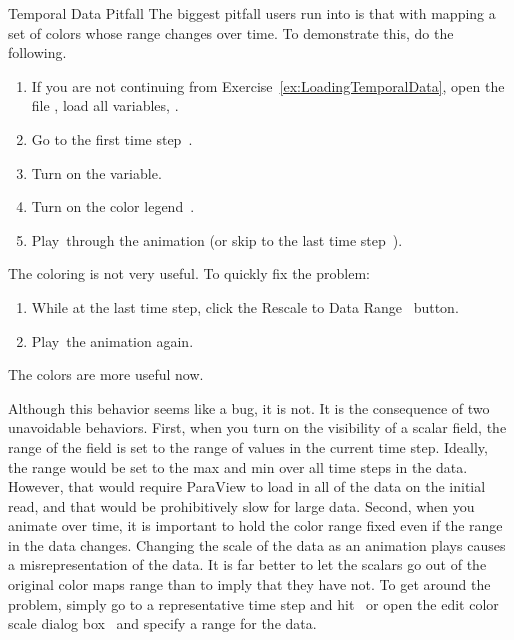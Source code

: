 \begin{exercise}{Temporal Data Pitfall}
  \label{ex:TemporalDataPitfall}%
  The biggest pitfall users run into is that with mapping a set of colors
  whose range changes over time.  To demonstrate this, do the following.

  \begin{enumerate}
  \item If you are not continuing from
    Exercise~\ref{ex:LoadingTemporalData}, open the file ,
    load all variables, \apply.
  \item Go to the first time step~\vcrFirst.
  \item Turn on the  variable.
  \item Turn on the color legend~.
  \item Play~\vcrPlay through the animation (or skip to the last time
    step~\vcrLast).
    \savecounter
  \end{enumerate}

  The coloring is not very useful.  To quickly fix the problem:

  \begin{enumerate}
    \restorecounter
  \item While at the last time step, click the Rescale to Data
    Range~ button.
  \item Play~\vcrPlay the animation again.
  \end{enumerate}

  The colors are more useful now.
\end{exercise}

Although this behavior seems like a bug, it is not.  It is the consequence
of two unavoidable behaviors.  First, when you turn on the visibility of a
scalar field, the range of the field is set to the range of values in the
current time step.  Ideally, the range would be set to the max and min over
all time steps in the data.  However, that would require ParaView to load
in all of the data on the initial read, and that would be prohibitively
slow for large data.  Second, when you animate over time, it is important
to hold the color range fixed even if the range in the data changes.
Changing the scale of the data as an animation plays causes a
misrepresentation of the data.  It is far better to let the scalars go out
of the original color maps range than to imply that they have not.  To get
around the problem, simply go to a representative time step and
hit~ or open the edit color scale dialog
box~ and specify a range for the data.


